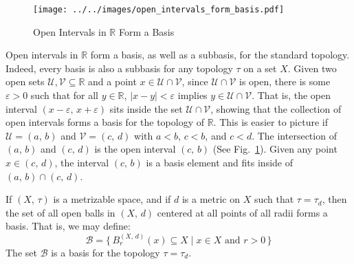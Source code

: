 \documentclass{article}
\theoremstyle{plain}
\theoremstyle{normal}
\newenvironment{example}{%
    \pushQED{\qed}\renewcommand{\qedsymbol}{$\blacksquare$}\examplex%
}{%
    \popQED\endexamplex%
}
\begin{document}
        \begin{figure}
            \centering
            \texttt{[image: ../../images/open\_intervals\_form\_basis.pdf]}
            \caption{Open Intervals in $\mathbb{R}$ Form a Basis}
            \label{fig:open_intervals_form_basis}
        \end{figure}
        \begin{example}
            Open intervals in $\mathbb{R}$ form a basis, as well as a subbasis,
            for the standard topology. Indeed, every basis is also a subbasis
            for any topology $\tau$ on a set $X$.
            Given two open sets $\mathcal{U},\mathcal{V}\subseteq\mathbb{R}$
            and a point $x\in\mathcal{U}\cap\mathcal{V}$, since
            $\mathcal{U}\cap\mathcal{V}$ is open, there is some
            $\varepsilon>0$ such that for all $y\in\mathbb{R}$,
            $|x-y|<\varepsilon$ implies $y\in\mathcal{U}\cap\mathcal{V}$. That
            is, the open interval $(x-\varepsilon,\,x+\varepsilon)$ sits inside
            the set $\mathcal{U}\cap\mathcal{V}$, showing that the collection
            of open intervals forms a basis for the topology of $\mathbb{R}$.
            This is easier to picture if $\mathcal{U}=(a,\,b)$ and
            $\mathcal{V}=(c,\,d)$ with $a<b$, $c<b$, and $c<d$. The
            intersection of $(a,\,b)$ and $(c,\,d)$ is the open interval
            $(c,\,b)$ (See Fig.~\ref{fig:open_intervals_form_basis}). Given
            any point $x\in(c,\,d)$, the interval $(c,\,b)$ is a basis element
            and fits inside of $(a,\,b)\cap(c,\,d)$.
        \end{example}
        \begin{example}
            If $(X,\,\tau)$ is a metrizable space, and if $d$ is a metric on
            $X$ such that $\tau=\tau_{d}$, then the set of all open balls
            in $(X,\,d)$ centered at all points of all radii forms a basis.
            That is, we may define:
            \begin{equation}
                \mathcal{B}=\{\,B_{r}^{(X,\,d)}(x)\subseteq{X}\;|\;
                    x\in{X}\textrm{ and }r>0\,\}
            \end{equation}
            The set $\mathcal{B}$ is a basis for the topology
            $\tau=\tau_{d}$.
        \end{example}
\end{document}
